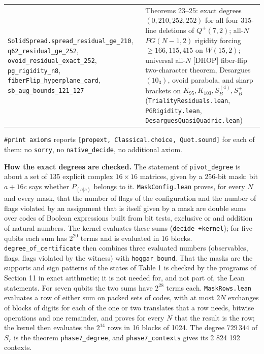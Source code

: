 \documentclass[11pt,a4paper]{article}
\begin{document}
{{\begin{longtable}[]{@{}>{\raggedright\arraybackslash}p{}>{\raggedright\arraybackslash}p{}@{}}
\nolinkurl{SolidSpread.spread_residual_ge_210}, \nolinkurl{q62_residual_ge_252}, \nolinkurl{ovoid_residual_exact_252}, \nolinkurl{pg_rigidity_n8}, \nolinkurl{fiberFlip_hyperplane_card}, \nolinkurl{sb_aug_bounds_121_127} & Theorems 23--25: exact degrees \((0,210,252,252)\) for all four 315-line deletions of \(Q^+(7,2)\); all-\(N\) \(PG(N-1,2)\) rigidity forcing \(\ge 166{,}115{,}415\) on \(W(15,2)\); universal all-\(N\) {[}DHOP{]} fiber-flip two-character theorem, Desargues \((10_3)\), ovoid parabola, and sharp brackets on \(K_{95}, K_{103}, S_B^{(4)}, S_B^+\) (\nolinkurl{TrialityResiduals.lean}, \nolinkurl{PGRigidity.lean}, \nolinkurl{DesarguesQuasiQuadric.lean}) \\
\end{longtable}
}
}

\texttt{\#print\ axioms} reports \texttt{{[}propext,\ Classical.choice,\ Quot.sound{]}} for each of them: no \texttt{sorry}, no
\texttt{native\_decide}, no additional axiom.

\textbf{How the exact degrees are checked.} The statement of \texttt{pivot\_degree} is about a set of 135 explicit
complex \(16 \times 16\) matrices, given by a 256-bit mask: bit \(a + 16c\) says whether \(P_{(a|c)}\) belongs to
it. \texttt{MaskConfig.lean} proves, for every \(N\) and every mask, that the number of flags of the configuration
and the number of flags violated by an assignment that is itself given by a mask are double sums over
codes of Boolean expressions built from bit tests, exclusive or and addition of natural numbers. The
kernel evaluates these sums (\texttt{decide\ +kernel}); for five qubits each sum has \(2^{20}\) terms and is
evaluated in 16 blocks. \nolinkurl{degree_of_certificate} then combines three evaluated numbers (observables,
flags, flags violated by the witness) with \texttt{hoggar\_bound}. That the masks are the supports and sign
patterns of the states of Table 1 is checked by the programs of Section 11 in exact arithmetic; it is
not needed for, and not part of, the Lean statements. For seven qubits the two sums have \(2^{28}\) terms
each. \texttt{MaskRows.lean} evaluates a row of either sum on packed sets of codes, with at most \(2N\) exchanges
of blocks of digits for each of the one or two translates that a row needs, bitwise operations and one
remainder, and proves for every \(N\) that the result is the row; the kernel then evaluates the \(2^{14}\) rows in 16 blocks of 1024. The degree \(729\,344\) of
\(S_7\) is the theorem \texttt{phase7\_degree}, and \texttt{phase7\_contexts} gives its 2 824 192 contexts.
\end{document}
